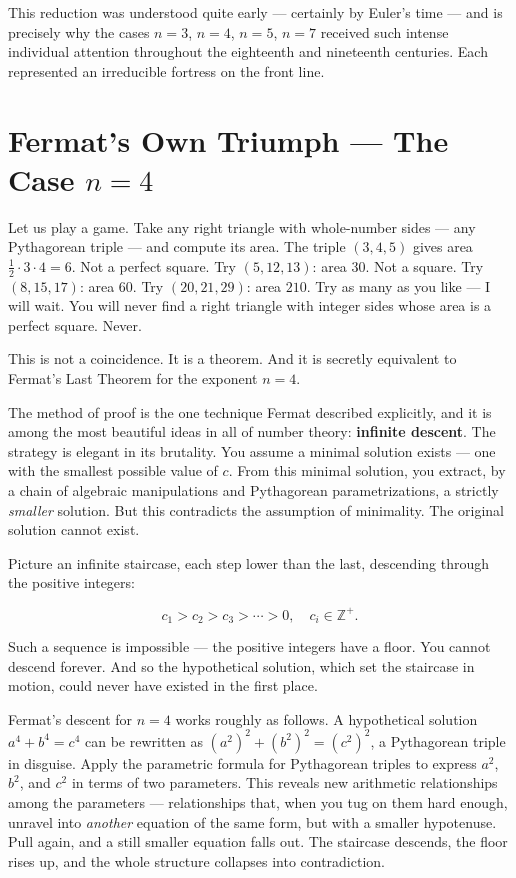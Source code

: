 \documentclass[11pt,twoside,openright]{book}
\theoremstyle{definition}
\theoremstyle{remark}
\begin{document}
This reduction was understood quite early --- certainly by Euler's time --- and is precisely why the cases $n = 3$, $n = 4$, $n = 5$, $n = 7$ received such intense individual attention throughout the eighteenth and nineteenth centuries. Each represented an irreducible fortress on the front line.


\section{Fermat's Own Triumph --- The Case $n = 4$}

Let us play a game. Take any right triangle with whole-number sides --- any Pythagorean triple --- and compute its area. The triple $(3, 4, 5)$ gives area $\tfrac{1}{2} \cdot 3 \cdot 4 = 6$. Not a perfect square. Try $(5, 12, 13)$: area $30$. Not a square. Try $(8, 15, 17)$: area $60$. Try $(20, 21, 29)$: area $210$. Try as many as you like --- I will wait. You will never find a right triangle with integer sides whose area is a perfect square. Never.

This is not a coincidence. It is a theorem. And it is secretly equivalent to Fermat's Last Theorem for the exponent $n = 4$.

The method of proof is the one technique Fermat described explicitly, and it is among the most beautiful ideas in all of number theory: \textbf{infinite descent}. The strategy is elegant in its brutality. You assume a minimal solution exists --- one with the smallest possible value of $c$. From this minimal solution, you extract, by a chain of algebraic manipulations and Pythagorean parametrizations, a strictly \textit{smaller} solution. But this contradicts the assumption of minimality. The original solution cannot exist.

Picture an infinite staircase, each step lower than the last, descending through the positive integers:

\[c_1 > c_2 > c_3 > \cdots > 0, \quad c_i \in \mathbb{Z}^+.\]

Such a sequence is impossible --- the positive integers have a floor. You cannot descend forever. And so the hypothetical solution, which set the staircase in motion, could never have existed in the first place.


Fermat's descent for $n = 4$ works roughly as follows. A hypothetical solution $a^4 + b^4 = c^4$ can be rewritten as $(a^2)^2 + (b^2)^2 = (c^2)^2$, a Pythagorean triple in disguise. Apply the parametric formula for Pythagorean triples to express $a^2$, $b^2$, and $c^2$ in terms of two parameters. This reveals new arithmetic relationships among the parameters --- relationships that, when you tug on them hard enough, unravel into \textit{another} equation of the same form, but with a smaller hypotenuse. Pull again, and a still smaller equation falls out. The staircase descends, the floor rises up, and the whole structure collapses into contradiction.
\end{document}
